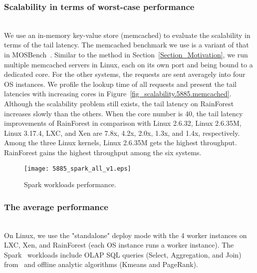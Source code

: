 \documentclass[pageno]{jpaper}
\begin{document}
\subsubsection{Scalability in terms of worst-case performance}
\textrm{\\} We use an in-memory key-value store (memcached) to evaluate the scalability in terms of the tail latency. The memcached benchmark we use is a variant of that in MOSBench~\cite{Boyd-Wickizer:2010:MOSBench}. Similar to the method in Section~\ref{Section_Motivation}, we run multiple memcached servers in Linux, each on its own port and being bound to a dedicated core. For the other systems, the requests are sent averagely into four OS instances. We profile the lookup time of all requests and present the tail latencies with increasing cores in Figure~\ref{fig_scalability.5885.memcached}. Although the scalability problem still exists, the tail latency on RainForest increases slowly than the others. When the core number is 40, the tail latency improvements of RainForest in comparison with Linux 2.6.32, Linux 2.6.35M, Linux 3.17.4, LXC, and Xen are 7.8x, 4.2x, 2.0x, 1.3x, and 1.4x, respectively. Among the three Linux kernels, Linux 2.6.35M gets the highest throughput. RainForest gains the highest throughput among the six systems.





\begin{figure}[t]
\setlength{\abovecaptionskip}{3pt}
\setlength{\belowcaptionskip}{0pt}
  \centering
  \texttt{[image: 5885\_spark\_all\_v1.eps]}
  \caption{Spark workloads performance.} \label{fig_spark_all_workloads}
\end{figure}











\subsubsection{The average performance}\label{evaluation_spark}
\textrm{\\} On Linux, we use the "standalone" deploy mode with the  4 worker instances on LXC, Xen, and RainForest (each OS instance runs a worker instance). The Spark~\cite{zaharia2012resilient} workloads include OLAP SQL queries (Select, Aggregation, and Join) from~\cite{Wang:2014:BigDataBench, pavlo2009comparison} and offline analytic algorithms (Kmeans and PageRank).
\end{document}
